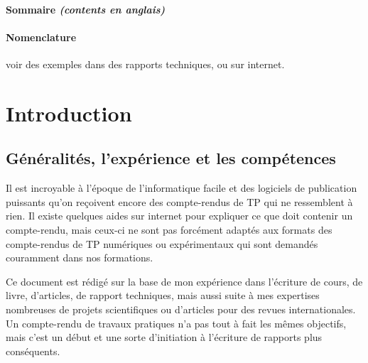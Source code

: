 \paragraph{Sommaire \textit{(contents en anglais)}}

\tableofcontents



\paragraph{Nomenclature}

voir des exemples dans des rapports techniques, ou sur internet.



\section{Introduction}

\subsection{Généralités, l'expérience et les compétences}

Il est incroyable à l'époque de l'informatique facile et des logiciels de publication puissants  qu'on reçoivent encore des compte-rendus de TP qui ne ressemblent à rien. Il existe quelques aides sur internet pour expliquer ce que doit contenir un compte-rendu, mais ceux-ci ne sont pas forcément adaptés aux formats des compte-rendus de TP numériques ou expérimentaux qui sont demandés couramment dans nos formations. 

Ce document est rédigé sur la base de mon expérience dans l'écriture de cours, de livre, d'articles, de rapport techniques, mais aussi suite à mes expertises nombreuses de projets scientifiques ou d'articles pour des revues internationales.
Un compte-rendu de travaux pratiques n'a pas tout à fait les mêmes objectifs, mais c'est un début et une sorte d'initiation à l'écriture de rapports plus conséquents.


